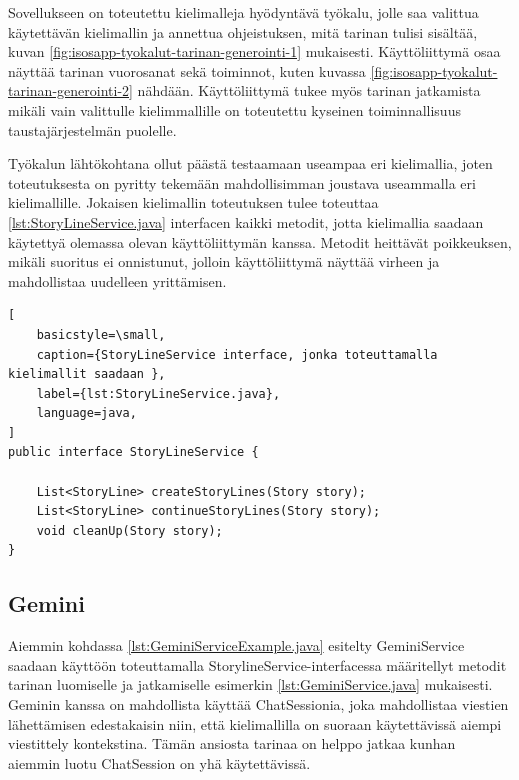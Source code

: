 Sovellukseen on toteutettu kielimalleja hyödyntävä työkalu, jolle saa valittua
käytettävän kielimallin ja annettua ohjeistuksen, mitä tarinan tulisi sisältää,
kuvan \ref{fig:isosapp-tyokalut-tarinan-generointi-1} mukaisesti.
Käyttöliittymä osaa näyttää tarinan vuorosanat sekä toiminnot, kuten kuvassa
\ref{fig:isosapp-tyokalut-tarinan-generointi-2} nähdään. Käyttöliittymä tukee
myös tarinan jatkamista mikäli vain valittulle kielimmallille on toteutettu
kyseinen toiminnallisuus taustajärjestelmän puolelle.

Työkalun lähtökohtana ollut päästä testaamaan useampaa eri kielimallia, joten
toteutuksesta on pyritty tekemään mahdollisimman joustava useammalla eri
kielimallille. Jokaisen kielimallin toteutuksen tulee toteuttaa
\ref{lst:StoryLineService.java} interfacen kaikki metodit, jotta kielimallia
saadaan käytettyä olemassa olevan käyttöliittymän kanssa. Metodit heittävät
poikkeuksen, mikäli suoritus ei onnistunut, jolloin käyttöliittymä näyttää
virheen ja mahdollistaa uudelleen yrittämisen.

\clearpage
\begin{lstlisting}[
    basicstyle=\small,
    caption={StoryLineService interface, jonka toteuttamalla kielimallit saadaan },
    label={lst:StoryLineService.java},
    language=java,
]
public interface StoryLineService {

    List<StoryLine> createStoryLines(Story story);
    List<StoryLine> continueStoryLines(Story story);
    void cleanUp(Story story);
}
\end{lstlisting}

\subsection{Gemini}

Aiemmin kohdassa \ref{lst:GeminiServiceExample.java} esitelty GeminiService
saadaan käyttöön toteuttamalla StorylineService-interfacessa määritellyt
metodit tarinan luomiselle ja jatkamiselle esimerkin
\ref{lst:GeminiService.java} mukaisesti. Geminin kanssa on mahdollista käyttää
ChatSessionia, joka mahdollistaa viestien lähettämisen edestakaisin niin, että
kielimallilla on suoraan käytettävissä aiempi viestittely kontekstina. Tämän
ansiosta tarinaa on helppo jatkaa kunhan aiemmin luotu ChatSession on yhä
käytettävissä.

